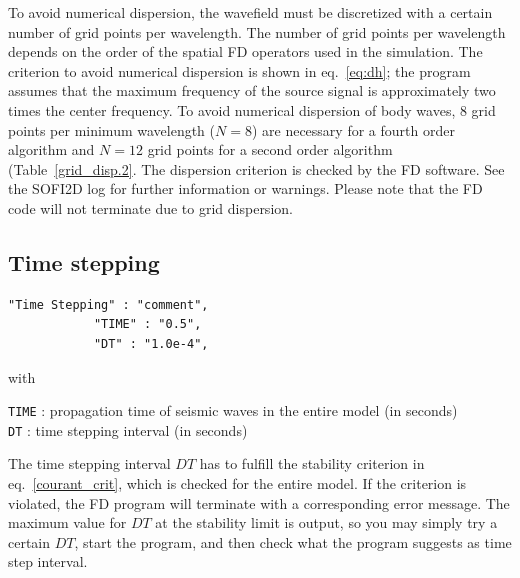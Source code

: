 To avoid numerical dispersion, the wavefield must be discretized with a certain number of grid points per wavelength. The number of grid points per wavelength depends on the order of the spatial FD operators used in the simulation. The criterion to avoid numerical dispersion is shown in eq.~\ref{eq:dh}; the program assumes that the maximum frequency of the source signal is approximately two times the center frequency. To avoid numerical dispersion of body waves, 8 grid points per minimum wavelength ($N=8$) are necessary for a fourth order algorithm and $N=12$ grid points for a second order algorithm (Table~\ref{grid_disp.2}. The dispersion criterion is checked by the FD software. See the SOFI2D log for further information or warnings. Please note that the FD code will not terminate due to grid dispersion.

\subsection{Time stepping}
\begin{verbatim}
"Time Stepping" : "comment",
			"TIME" : "0.5",
			"DT" : "1.0e-4",
\end{verbatim}

with

\texttt{TIME} : propagation time of seismic waves in the entire model (in seconds)\\
\texttt{DT} : time stepping interval (in seconds)

The time stepping interval $DT$ has to fulfill the stability criterion in eq.~\ref{courant_crit}, which is checked for the entire model. If the criterion is violated, the FD program will terminate with a corresponding error message. The maximum value for $DT$ at the stability limit is output, so you may simply try a certain $DT$, start the program, and then check what the program suggests as time step interval.

